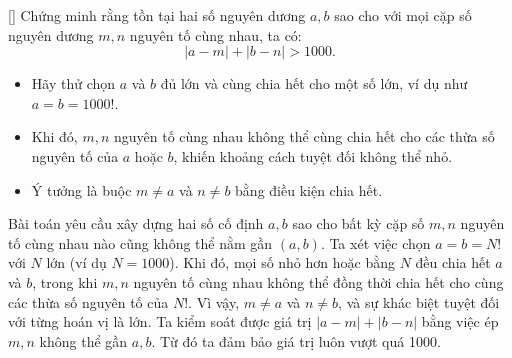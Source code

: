 \documentclass[../01-divisibility.tex]{subfiles}
\begin{document}
\begin{exercise*}\label{example:RUS-2015-TST-D10-P1}[\textbf{}]
    Chứng minh rằng tồn tại hai số nguyên dương \( a, b \) sao cho với mọi cặp số nguyên dương \( m, n \) nguyên tố cùng nhau, ta có:
    \[
        |a - m| + |b - n| > 1000.
    \]
\end{exercise*}

\begin{remark*}
    \begin{itemize}[topsep=0pt, partopsep=0pt, itemsep=0pt]
        \item Hãy thử chọn \( a \) và \( b \) đủ lớn và cùng chia hết cho một số lớn, ví dụ như \( a = b = 1000! \).
        \item Khi đó, \( m, n \) nguyên tố cùng nhau không thể cùng chia hết cho các thừa số nguyên tố của \( a \) hoặc \( b \), khiến khoảng cách tuyệt đối không thể nhỏ.
        \item Ý tưởng là buộc \( m \ne a \) và \( n \ne b \) bằng điều kiện chia hết.
    \end{itemize}
\end{remark*}

\begin{story*}
    Bài toán yêu cầu xây dựng hai số cố định \( a, b \) sao cho bất kỳ cặp số \( m, n \) nguyên tố cùng nhau nào cũng không thể nằm gần \( (a, b) \).
    Ta xét việc chọn \( a = b = N! \) với \( N \) lớn (ví dụ \( N = 1000 \)).
    Khi đó, mọi số nhỏ hơn hoặc bằng \( N \) đều chia hết \( a \) và \( b \),
    trong khi \( m, n \) nguyên tố cùng nhau không thể đồng thời chia hết cho cùng các thừa số nguyên tố của \( N! \).
    Vì vậy, \( m \ne a \) và \( n \ne b \), và sự khác biệt tuyệt đối với từng hoán vị là lớn.
    Ta kiểm soát được giá trị \( |a - m| + |b - n| \) bằng việc ép \( m, n \) không thể gần \( a, b \). Từ đó ta đảm bảo giá trị luôn vượt quá 1000.
\end{story*}
\end{document}

